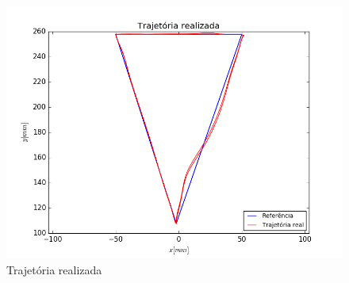 \documentclass[]{politex}
\begin{document}
\begin{figure}[H]
	\centering
	\includegraphics[scale=0.39]{../../../Experimental/Aquisicoes/SMCx_triangulo/xy.png}  
	\caption{Trajetória realizada}
	\label{fig:SMCx_triangulo_xy}
\end{figure}
\end{document}
